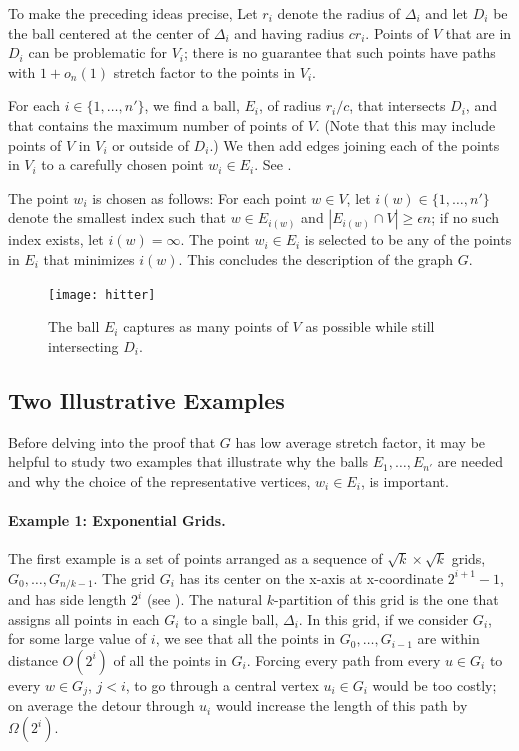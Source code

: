 \documentclass{patmorin}
\begin{document}
To make the preceding ideas precise, Let $r_i$ denote the radius
of $\Delta_i$ and let $D_i$ be the ball centered at the center of
$\Delta_i$ and having radius $cr_i$.  Points of $V$ that are in $D_i$
can be problematic for $V_i$; there is no guarantee that such points
have paths with $1+o_n(1)$ stretch factor to the points in $V_i$.

For each $i\in\{1,\ldots,n'\}$, we find a ball, $E_i$, of radius $r_i/c$,
that intersects $D_i$, and that contains the maximum number of points
of $V$.  (Note that this may include points of $V$ in $V_i$ or outside
of $D_i$.)  We then add edges joining each of the points in $V_i$ to
a carefully chosen point $w_i\in E_i$.  See .

The point $w_i$ is chosen as follows: For each point $w\in V$, let
$i(w)\in \{1,\ldots,n'\}$ denote the smallest index such that $w\in
E_{i(w)}$ and $|E_{i(w)}\cap V| \ge \epsilon n$; if no such index exists,
let $i(w)=\infty$.  The point $w_i\in E_i$ is selected to be any of the
points in $E_i$ that minimizes $i(w)$.  This concludes the description
of the graph $G$.


\begin{figure}
  \begin{center}
    \texttt{[image: hitter]}
  \end{center}
  \caption{The ball $E_i$ captures as many points of $V$ as possible
   while still intersecting $D_i$.}
\end{figure}

\subsection{Two Illustrative Examples}
Before delving into the proof that $G$ has low average stretch factor,
it may be helpful to study two examples that illustrate why the balls
$E_1,\ldots,E_{n'}$ are needed and why the choice of the representative
vertices, $w_i\in E_i$, is  important.

\paragraph{Example 1: Exponential Grids.}
The first example is a set of points arranged as a sequence of
$\sqrt{k}\times\sqrt{k}$ grids, $G_0,\ldots,G_{n/k-1}$.  The grid $G_i$
has its center on the x-axis at x-coordinate $2^{i+1}-1$, and has side
length $2^i$ (see ). The natural $k$-partition of this
grid is the one that assigns all points in each $G_i$ to a single ball,
$\Delta_i$.  In this grid, if we consider $G_i$, for some large value
of $i$, we see that all the points in $G_0,\ldots,G_{i-1}$ are within
distance $O(2^{i})$ of all the points in $G_i$.  Forcing every path from
every $u\in G_i$ to every $w\in G_{j}$, $j<i$, to go through a central
vertex $u_i\in G_i$ would be too costly; on average the detour through
$u_i$ would increase the length of this path by $\Omega(2^{i})$.
\end{document}

